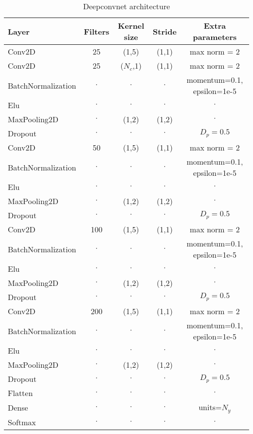 \begin{table}[h!]
\caption{Deepconvnet architecture}\label{table:deepconvnet}
\centering
\begin{tabular}{l|c|c|c|c}
\hline
\textbf{Layer} & \textbf{Filters} & \textbf{Kernel size} & \textbf{Stride} & \textbf{Extra parameters}\\
\hline
Conv2D & 25 & (1,5) & (1,1)&max norm = 2 \\
Conv2D & 25 & ($N_c$,1) & (1,1)&max norm = 2 \\
BatchNormalization & $\cdot$ & $\cdot$ & $\cdot$ & momentum=0.1, epsilon=1e-5\\ 
Elu & $\cdot$ & $\cdot$ & $\cdot$ & $\cdot$\\
MaxPooling2D & $\cdot$ &(1,2) & (1,2)& $\cdot$\\
Dropout & $\cdot$ & $\cdot$ & $\cdot$ & $D_p = 0.5$\\
\hline
Conv2D & 50 & (1,5) & (1,1)&max norm = 2 \\
BatchNormalization & $\cdot$ & $\cdot$ & $\cdot$ & momentum=0.1, epsilon=1e-5\\ 
Elu & $\cdot$ & $\cdot$ & $\cdot$ & $\cdot$\\
MaxPooling2D & $\cdot$ &(1,2) & (1,2)& $\cdot$\\
Dropout & $\cdot$ & $\cdot$ & $\cdot$ & $D_p = 0.5$\\
\hline
Conv2D & 100 & (1,5) & (1,1)&max norm = 2 \\
BatchNormalization & $\cdot$ & $\cdot$ & $\cdot$ & momentum=0.1, epsilon=1e-5\\ 
Elu & $\cdot$ & $\cdot$ & $\cdot$ & $\cdot$\\
MaxPooling2D & $\cdot$ &(1,2) & (1,2)& $\cdot$\\
Dropout & $\cdot$ & $\cdot$ & $\cdot$ & $D_p = 0.5$\\
\hline
Conv2D & 200 & (1,5) & (1,1)&max norm = 2 \\
BatchNormalization & $\cdot$ & $\cdot$ & $\cdot$ & momentum=0.1, epsilon=1e-5\\ 
Elu & $\cdot$ & $\cdot$ & $\cdot$ & $\cdot$\\
MaxPooling2D & $\cdot$ &(1,2) & (1,2)& $\cdot$\\
Dropout & $\cdot$ & $\cdot$ & $\cdot$ & $D_p = 0.5$\\
\hline
Flatten & $\cdot$ & $\cdot$ & $\cdot$ & $\cdot$\\
Dense & $\cdot$ & $\cdot$ & $\cdot$ & units=$N_y$\\
Softmax & $\cdot$ & $\cdot$ & $\cdot$ & $\cdot$\\
\hline
\end{tabular}
\end{table}

